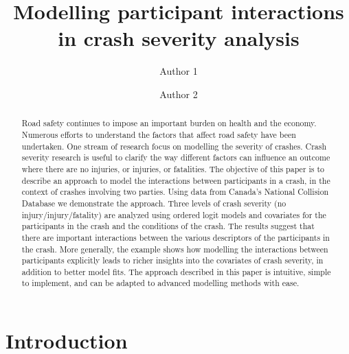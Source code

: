 \documentclass[]{elsarticle} %
\begin{document}
\begin{frontmatter}

  \title{Modelling participant interactions in crash severity analysis}
    \author[Some University]{Author 1}
    \author[Some Institute of Technology]{Author 2}
  
      \address[Some University]{Department, Street, City, State, Zip}
    \address[Some Institute of Technology]{Department, Street, City, State, Zip}
  
  \begin{abstract}
  Road safety continues to impose an important burden on health and the
  economy. Numerous efforts to understand the factors that affect road
  safety have been undertaken. One stream of research focus on modelling
  the severity of crashes. Crash severity research is useful to clarify
  the way different factors can influence an outcome where there are no
  injuries, or injuries, or fatalities. The objective of this paper is to
  describe an approach to model the interactions between participants in a
  crash, in the context of crashes involving two parties. Using data from
  Canada's National Collision Database we demonstrate the approach. Three
  levels of crash severity (no injury/injury/fatality) are analyzed using
  ordered logit models and covariates for the participants in the crash
  and the conditions of the crash. The results suggest that there are
  important interactions between the various descriptors of the
  participants in the crash. More generally, the example shows how
  modelling the interactions between participants explicitly leads to
  richer insights into the covariates of crash severity, in addition to
  better model fits. The approach described in this paper is intuitive,
  simple to implement, and can be adapted to advanced modelling methods
  with ease.
  \end{abstract}
  
 \end{frontmatter}

\hypertarget{introduction}{%
\section{Introduction}\label{introduction}}
\end{document}
